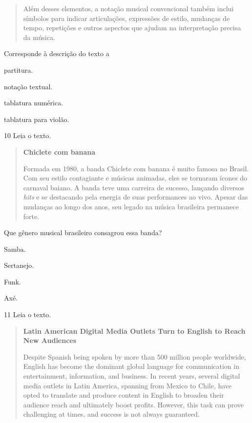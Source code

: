 \begin{quote}
Além desses elementos, a notação musical convencional também inclui símbolos para indicar articulações, expressões de estilo, mudanças de tempo, repetições e outros aspectos que ajudam na interpretação precisa da música.

\end{quote}

Corresponde à descrição do texto a

\begin{escolha}
\item partitura.
\item notação textual.
\item tablatura numérica.
\item tablatura para violão.
\end{escolha}


\num{10} Leia o texto.

\begin{quote}
\textbf{Chiclete com banana}

Formada em 1980, a banda Chiclete com banana é muito famosa no Brasil. Com seu estilo contagiante e músicas 
animadas, eles se tornaram ícones do carnaval baiano. A banda teve uma carreira de sucesso, lançando 
diversos \textit{hits} e se destacando pela energia de suas performances ao vivo. Apesar das mudanças ao 
longo dos anos, seu legado na música brasileira permanece forte.

\end{quote}

Que gênero musical brasileiro consagrou essa banda?

\begin{escolha}
\item
  Samba.
\item
  Sertanejo.
\item
  Funk.
\item
  Axé.
\end{escolha}

\num{11} Leia o texto.

\begin{quote}
\textbf{Latin American Digital Media Outlets Turn to English to Reach New Audiences}

Despite Spanish being spoken by more than 500 million people worldwide,
English has become the dominant global language for communication in
entertainment, information, and business. In recent years, several
digital media outlets in Latin America, spanning from Mexico to Chile,
have opted to translate and produce content in English to broaden their
audience reach and ultimately boost profits. However, this task can
prove challenging at times, and success is not always guaranteed.

\end{quote}

